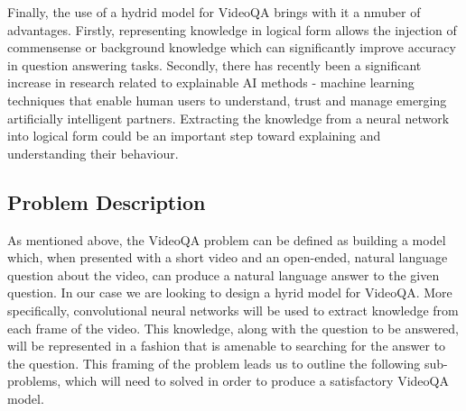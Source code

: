 Finally, the use of a hydrid model for VideoQA brings with it a nmuber of advantages. Firstly, representing knowledge in logical form allows the injection of commensense or background knowledge which can significantly improve accuracy in question answering tasks\cite{motivation:external-knowledge}. Secondly, there has recently been a significant increase in research related to explainable AI methods - machine learning techniques that enable human users to understand, trust and manage emerging artificially intelligent partners\cite{def:xai}. Extracting the knowledge from a neural network into logical form could be an important step toward explaining and understanding their behaviour.


\subsection{Problem Description}

As mentioned above, the VideoQA problem can be defined as building a model which, when presented with a short video and an open-ended, natural language question about the video, can produce a natural language answer to the given question. In our case we are looking to design a hyrid model for VideoQA. More specifically, convolutional neural networks will be used to extract knowledge from each frame of the video. This knowledge, along with the question to be answered, will be represented in a fashion that is amenable to searching for the answer to the question. This framing of the problem leads us to outline the following sub-problems, which will need to solved in order to produce a satisfactory VideoQA model.

